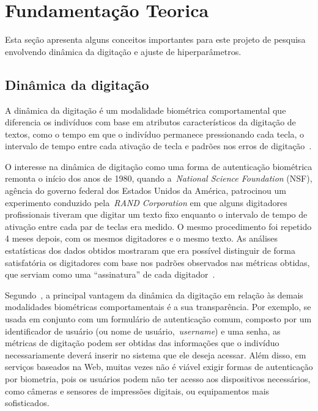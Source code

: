 \section{Fundamentação Teorica}\label{sec:fundamentacao_teorica}

Esta seção apresenta alguns conceitos importantes para este projeto de pesquisa envolvendo dinâmica da digitação e ajuste de hiperparâmetros.


\subsection{Dinâmica da digitação}\label{subsec:dinamica_de_digitacao}

A dinâmica da digitação é um modalidade biométrica comportamental que diferencia os indivíduos com base em atributos característicos da digitação de textos, como o tempo em que o indivíduo permanece pressionando cada tecla, o intervalo de tempo entre cada ativação de tecla e padrões nos erros de digitação~\cite{biometric_personal_auth_using_keystroke_dynamics}.

O interesse na dinâmica de digitação como uma forma de autenticação biométrica remonta o início dos anos de 1980, quando a~\textit{National Science Foundation} (NSF), agência do governo federal dos Estados Unidos da América, patrocinou um experimento conduzido pela~\textit{RAND Corporation} em que alguns digitadores profissionais tiveram que digitar um texto fixo enquanto o intervalo de tempo de ativação entre cada par de teclas era medido. O mesmo procedimento foi repetido 4 meses depois, com os mesmos digitadores e o mesmo texto. As análises estatísticas dos dados obtidos mostraram que era possível distinguir de forma satisfatória os digitadores com base nos padrões observados nas métricas obtidas, que serviam como uma ``assinatura'' de cada digitador~\cite{authentication_by_keystroke_timing}.

Segundo~, a principal vantagem da dinâmica da digitação em relação às demais modalidades biométricas comportamentais é a sua transparência. Por exemplo, se usada em conjunto com um formulário de autenticação comum, composto por um identificador de usuário (ou nome de usuário,~\textit{username}) e uma senha, as métricas de digitação podem ser obtidas das informações que o indivíduo necessariamente deverá inserir no sistema que ele deseja acessar. Além disso, em serviços baseados na Web, muitas vezes não é viável exigir formas de autenticação por biometria, pois os usuários podem não ter acesso aos dispositivos necessários, como câmeras e sensores de impressões digitais, ou equipamentos mais sofisticados.


